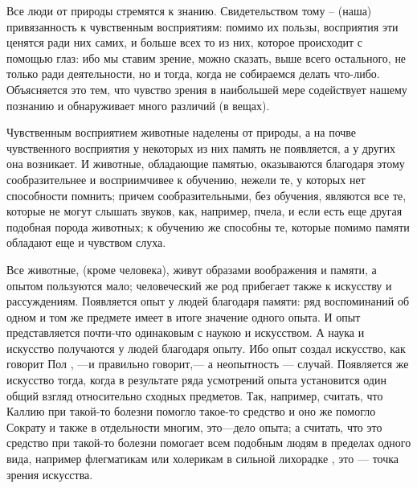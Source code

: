 \documentclass[oneside, 17pt, dvipsnames]{extbook}
\begin{document}
Все люди от природы стремятся к знанию. Свидетельством тому -- (наша) привязанность к чувственным восприятиям: помимо их пользы, восприятия эти ценятся ради них самих, и больше всех то из них, которое происходит с помощью глаз: ибо мы ставим зрение, можно сказать, выше всего остального, не только ради деятельности, но и тогда, когда не собираемся делать что-либо. Объясняется это тем, что чувство зрения в наибольшей мере содействует нашему познанию и обнаруживает много различий (в вещах).

Чувственным восприятием животные наделены от природы, а на почве чувственного восприятия у некоторых из них память не появляется, а у других она возникает. И животные, обладающие памятью, оказываются благодаря этому сообразительнее и восприимчивее к обучению, нежели те, у которых нет способности помнить; причем сообразительными, без обучения, являются все те, которые не могут слышать звуков, как, например, пчела, и если есть еще другая подобная порода животных; к обучению же способны те, которые помимо памяти обладают еще и чувством слуха.

Все животные, (кроме человека), живут образами воображения и памяти, а опытом пользуются мало; человеческий же род прибегает также к искусству и рассуждениям. Появляется опыт у людей благодаря памяти: ряд воспоминаний об одном и том же предмете имеет в итоге значение одного опыта. И опыт представляется почти-что одинаковым с наукою и искусством. А наука и искусство получаются у людей благодаря опыту. Ибо опыт создал искусство, как говорит Пол
\footnotemark[1]
, —и правильно говорит,— а неопытность — случай. Появляется же искусство тогда, когда в результате ряда усмотрений опыта установится один общий взгляд относительно сходных предметов. Так, например, считать, что Каллию при такой-то болезни помогло такое-то средство и оно же помогло Сократу и также в отдельности многим, это—дело опыта; а считать, что это средство при такой-то болезни помогает всем подобным людям в пределах одного вида, например флегматикам или холерикам в сильной лихорадке
\footnotemark[2]
, это — точка зрения искусства.
\end{document}
